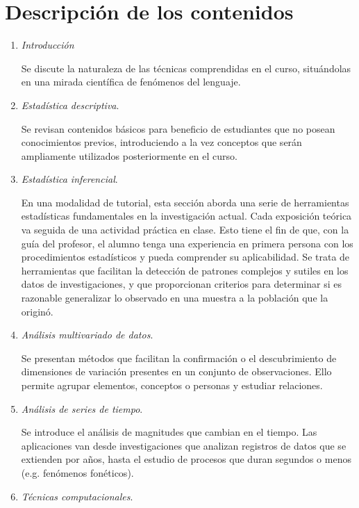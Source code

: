 \documentclass[letterpaper,11pt]{article}
\begin{document}
\section{Descripción de los contenidos}

\begin{enumerate}
  \item \emph{Introducción}
  
  Se discute la naturaleza de las técnicas comprendidas en el curso, situándolas en una mirada científica de fenómenos del lenguaje.
    
  \item \emph{Estad\'istica descriptiva}.\label{it:desc}
  
  Se revisan contenidos básicos para beneficio de estudiantes que no posean conocimientos previos, introduciendo a la vez conceptos que serán ampliamente utilizados posteriormente en el curso.

  \item \emph{Estad\'istica inferencial}.\label{it:inf}
  
  En una modalidad de tutorial, esta sección aborda una serie de herramientas estadísticas fundamentales en la investigación actual. Cada exposición teórica va seguida de una actividad práctica en clase. Esto tiene el fin de que, con la guía del profesor, el alumno tenga una experiencia en primera persona con los procedimientos estadísticos y pueda comprender su aplicabilidad. Se trata de herramientas que facilitan la detección de patrones complejos y sutiles en los datos de investigaciones, y que proporcionan criterios para determinar si es razonable generalizar lo observado en una muestra a la población que la originó.
  \item \emph{Análisis multivariado de datos}.
  
  Se presentan métodos que facilitan la confirmación o el descubrimiento de dimensiones de variación presentes en un conjunto de observaciones. Ello permite agrupar elementos, conceptos o personas y estudiar relaciones.
  
  \item \emph{Análisis de series de tiempo}.
  
  Se introduce el análisis de magnitudes que cambian en el tiempo. Las aplicaciones van desde investigaciones que analizan registros de datos que se extienden por años, hasta el estudio de procesos que duran segundos o menos (e.g. fenómenos fonéticos).
  
  \item \emph{Técnicas computacionales}.


\end{enumerate}
\end{document}
